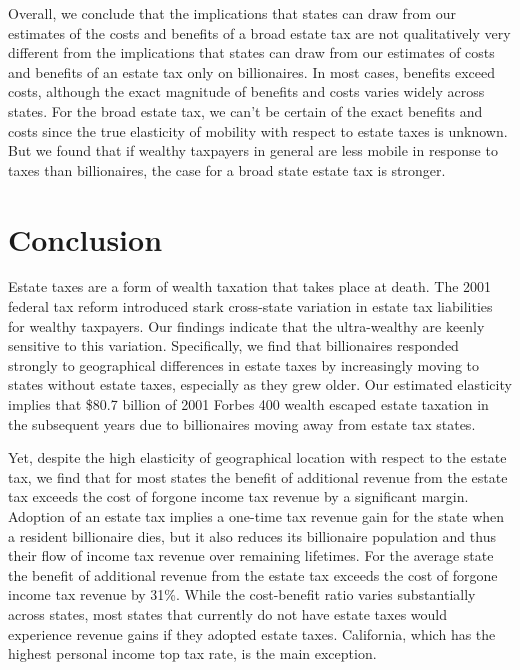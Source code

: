 \documentclass[12pt]{article}
\begin{document}
Overall, we conclude that the implications that states can draw from our estimates of the costs and benefits of a broad estate tax are not qualitatively very different from the implications that states can draw from our estimates 
of costs and benefits of an estate tax only on billionaires.  In most cases, benefits exceed costs, although the exact magnitude of benefits and costs varies widely across states.  For   the broad estate tax, we can't be certain of the exact benefits and costs since the true elasticity of mobility with respect to estate taxes is unknown. But we found that if wealthy taxpayers in general are less mobile in response to taxes than billionaires, the case for a broad state estate tax is  stronger.




\section{Conclusion}

Estate taxes are a form of wealth taxation that takes place at death.  The 2001 federal tax reform introduced stark cross-state variation in estate  tax liabilities for wealthy taxpayers. 
Our findings indicate that the ultra-wealthy are keenly sensitive to this variation. Specifically, 
we find that billionaires responded strongly to geographical differences in estate taxes by increasingly moving to states without estate taxes, especially as they grew older.  
Our estimated elasticity implies that  \$80.7 billion  of 2001 Forbes 400 wealth 
escaped estate taxation in the subsequent years due to  billionaires moving away from estate tax states. 

Yet, despite the high elasticity of geographical location with respect to the estate tax, 
we find that for most states the benefit of additional revenue from the estate tax exceeds the cost of forgone income tax revenue by a significant margin. 
Adoption of an estate tax implies a one-time tax revenue gain for the state when a resident billionaire dies, but it also reduces its billionaire population and thus their flow of income tax revenue over remaining lifetimes.  
For the average state the benefit of additional revenue from the estate tax exceeds the cost of forgone income tax revenue by 31\%. While the cost-benefit ratio varies substantially across states, most states
that currently do not have estate taxes would experience revenue gains if they adopted estate taxes. California, which has the highest personal income top tax rate, is the main exception.
\end{document}
